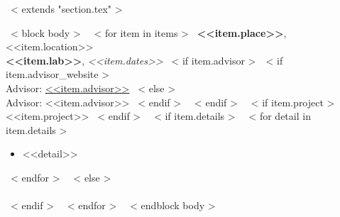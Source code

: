 ~< extends "section.tex" >~

~< block body >~
    ~< for item in items >~
        {\bf <<item.place>>}, <<item.location>> \\
        {\bf <<item.lab>>}, {\it <<item.dates>> }
        ~< if item.advisor >~~< if item.advisor_website >~
            \\ Advisor: \href{<<item.advisor_website>>}{\color{links}<<item.advisor>>}
        ~< else >~
            \\ Advisor: <<item.advisor>> 
            ~< endif >~
        ~< endif >~
        ~< if item.project >~ \\ <<item.project>> ~< endif >~
        ~< if item.details >~
            ~< for detail in item.details >~
            \begin{itemize}
              \item <<detail>>
            \end{itemize}
            ~< endfor >~
        ~< else >~
        \\ \\
        ~< endif >~
    ~< endfor >~
~< endblock body >~
